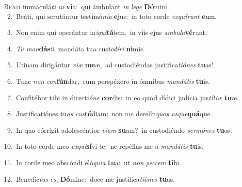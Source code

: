 \lettrine{\initial\textcolor{\initialcolor}{B}}{eáti} immaculá\textit{ti} \textit{in} \textbf{vi}\-a:~\star qui ámbulant \textit{in} \textit{le}\-\textit{ge} \textbf{Dó}\-mini.\\
{\numbfont\textcolor{\numbcolor}{~2.}}~Beáti, qui scrutántur testimó\-\textit{ni}\-\textit{a} \textbf{e}\-jus:~\star in toto corde \textit{ex}\-\textit{quí}\textit{runt} \textbf{e}\-um.\par
{\numbfont\textcolor{\numbcolor}{~3.}}~Non enim qui operántur in\-\textit{i}\-\textit{qui}\textbf{tá}tem,~\star in viis ejus \textit{am}\-\textit{bu}\textit{la}\textbf{vé}runt.\par
{\numbfont\textcolor{\numbcolor}{~4.}}~\textit{Tu} \textit{man}\-\textbf{dás}ti~\star mandáta tua cus\-\textit{to}\-\textit{dí}\textit{ri} \textbf{ni}\-mis.\par
{\numbfont\textcolor{\numbcolor}{~5.}}~Utinam dirigántur \textit{vi}\-\textit{æ} \textbf{me}\-æ,~\star ad custodiéndas justifica\-\textit{ti}\-\textit{ó}\textit{nes} \textbf{tu}\-as!\par
{\numbfont\textcolor{\numbcolor}{~6.}}~Tunc \textit{non} \textit{con}\-\textbf{fún}dar,~\star cum perspéxero in ómnibus \textit{man}\-\textit{dá}\textit{tis} \textbf{tu}\-is.\par
{\numbfont\textcolor{\numbcolor}{~7.}}~Confitébor tibi in directi\-\textit{ó}\-\textit{ne} \textbf{cor}\-dis:~\star in eo quod dídici judícia jus\-\textit{tí}\-\textit{ti}\textit{æ} \textbf{tu}\-æ.\par
{\numbfont\textcolor{\numbcolor}{~8.}}~Justificatiónes tu\textit{as} \textit{cus}\-\textbf{tó}diam:~\star non me derelín\textit{quas} \textit{us}\-\textit{que}\textbf{quá}que.\par
{\numbfont\textcolor{\numbcolor}{~9.}}~In quo córrigit adolescéntior \textit{vi}\-\textit{am} \textbf{su}\-am?~\star in custodiéndo \textit{ser}\-\textit{mó}\textit{nes} \textbf{tu}\-os.\par
{\numbfont\textcolor{\numbcolor}{10.}}~In toto corde meo \textit{ex}\-\textit{qui}\textbf{sí}vi te:~\star ne repéllas me a \textit{man}\-\textit{dá}\textit{tis} \textbf{tu}\-is.\par
{\numbfont\textcolor{\numbcolor}{11.}}~In corde meo abscóndi eló\-\textit{qui}\-\textit{a} \textbf{tu}\-a:~\star ut \textit{non} \textit{pec}\-\textit{cem} \textbf{ti}\-bi.\par
{\numbfont\textcolor{\numbcolor}{12.}}~Benedíc\textit{tus} \textit{es}\-, \textbf{Dó}\-mine:~\star doce me justifica\-\textit{ti}\-\textit{ó}\textit{nes} \textbf{tu}\-as.\par

